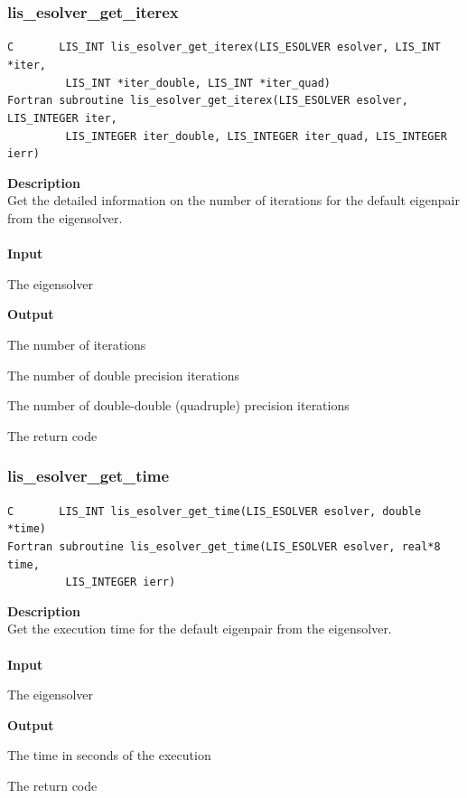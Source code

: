 \documentclass[a4paper]{article}
\newcommand{\namelistlabel}[1]{\mbox{#1}\hfill}
\newenvironment{namelist}[1]{%
\begin{list}{}
  {\let\makelabel\namelistlabel
  \settowidth{\labelwidth}{#1}
  \setlength{\leftmargin}{1.1\labelwidth}}
  }{%
\end{list}}
\begin{document}
\newpage
\subsubsection{lis\_esolver\_get\_iterex}
\begin{screen}
\verb|C       LIS_INT lis_esolver_get_iterex(LIS_ESOLVER esolver, LIS_INT *iter,|\\
\verb|         LIS_INT *iter_double, LIS_INT *iter_quad)|\\
\verb|Fortran subroutine lis_esolver_get_iterex(LIS_ESOLVER esolver, LIS_INTEGER iter,|\\
\verb|         LIS_INTEGER iter_double, LIS_INTEGER iter_quad, LIS_INTEGER ierr)|
\end{screen}
{\bf Description}\\
\indent
Get the detailed information on the number of iterations for the default eigenpair from the eigensolver.
\\ \\
\noindent
{\bf Input}
\begin{namelist}{XXXXXXXXXXXXXXXXXXXX}
\item[\tt esolver] The eigensolver
\end{namelist}
{\bf Output}
\begin{namelist}{XXXXXXXXXXXXXXXXXXXX}
\item[\tt iter] The number of iterations
\item[\tt iter\_double] The number of double precision iterations
\item[\tt iter\_quad] The number of double-double (quadruple) precision iterations
\item[\tt ierr] The return code
\end{namelist}

\subsubsection{lis\_esolver\_get\_time}
\begin{screen}
\verb|C       LIS_INT lis_esolver_get_time(LIS_ESOLVER esolver, double *time)|\\
\verb|Fortran subroutine lis_esolver_get_time(LIS_ESOLVER esolver, real*8 time,|\\
\verb|         LIS_INTEGER ierr)|
\end{screen}
{\bf Description}\\
\indent
Get the execution time for the default eigenpair from the eigensolver.
\\ \\
\noindent
{\bf Input}
\begin{namelist}{XXXXXXXXXXXXXXXXXXXX}
\item[\tt esolver] The eigensolver
\end{namelist}
{\bf Output}
\begin{namelist}{XXXXXXXXXXXXXXXXXXXX}
\item[\tt time] The time in seconds of the execution
\item[\tt ierr] The return code
\end{namelist}
\end{document}
